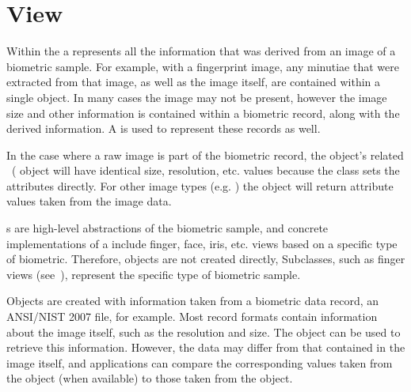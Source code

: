 %
%
\chapter{View}
\label{chp-view}
Within the \lname a  represents all the information that was derived
from an image of a biometric sample. For example, with a fingerprint image, any
minutiae that were extracted from that image, as well as the image itself,
are contained within a single  object. In many cases the image may
not be present, however the image size and other information is contained within
a biometric record, along with the derived information. A  is used
to represent these records as well.

In the case where a raw image is part of the biometric record, the  
object's related ~( object will have identical
size,
resolution, etc. values because the  class sets the 
attributes directly.
For other image types (e.g. ) the  object will return
attribute values taken from the image data.

s are high-level abstractions of the biometric sample, and concrete
implementations of a  include finger, face, iris, etc. views based
on a specific type of biometric. Therefore,  objects are not
created directly, Subclasses, such as finger views (see~),
represent the specific type of biometric sample.

Objects are created with information taken from a biometric data
record, an ANSI/NIST 2007 file, for example. Most record formats contain 
information about the image itself, such as the resolution and size. The 
 object can
be used to retrieve this information. However, the data may differ from that
contained in the image itself, and applications can compare the corresponding
values taken from the  object (when available) to those taken from 
the  object.

